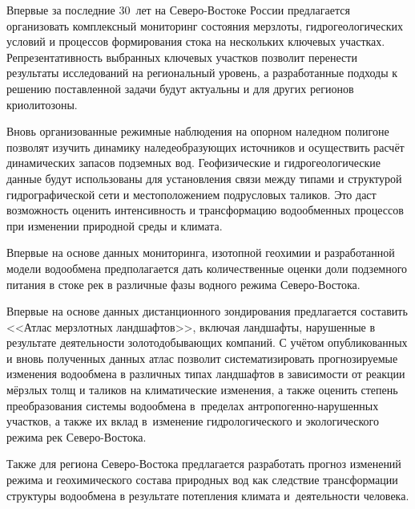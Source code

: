 Впервые за последние 30~лет на Северо-Востоке России предлагается организовать комплексный мониторинг состояния мерзлоты, гидрогеологических условий и процессов формирования стока на нескольких ключевых участках. Репрезентативность выбранных ключевых участков позволит перенести результаты исследований на региональный уровень, а разработанные подходы к решению поставленной задачи будут актуальны и для других регионов криолитозоны.

Вновь организованные режимные наблюдения на опорном наледном полигоне позволят изучить динамику наледеобразующих источников и осуществить расчёт динамических запасов подземных вод. Геофизические и гидрогеологические данные будут использованы для установления связи между типами и структурой гидрографической сети и местоположением подрусловых таликов. Это даст возможность оценить интенсивность и трансформацию водообменных процессов при изменении природной среды и климата.

Впервые на основе данных мониторинга, изотопной геохимии и разработанной модели водообмена предполагается дать количественные оценки доли подземного питания в стоке рек в различные фазы водного режима Северо-Востока.

Впервые на основе данных дистанционного зондирования предлагается составить <<Атлас мерзлотных ландшафтов>>, включая ландшафты, нарушенные в результате деятельности золотодобывающих компаний. С учётом опубликованных и вновь полученных данных атлас позволит систематизировать прогнозируемые изменения водообмена в различных типах ландшафтов в зависимости от реакции мёрзлых толщ и таликов на климатические изменения, а также оценить степень преобразования системы водообмена в~пределах антропогенно-нарушенных участков, а также их вклад в~изменение гидрологического и экологического режима рек Северо-Востока.

Также для региона Северо-Востока предлагается разработать прогноз изменений режима и геохимического состава природных вод как следствие трансформации структуры водообмена в результате потепления климата и~деятельности человека.

